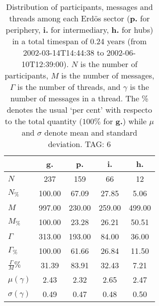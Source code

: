 \begin{table}[h!]
\begin{center}
\begin{tabular}{| l || c | c | c | c |}\hline
 & {\bf g.} & {\bf p.} & {\bf i.} & {\bf h.} \\\hline\hline
$N$ & 237  & 159  & 66  & 12 \\
$N_{\%}$ & 100.00  & 67.09  & 27.85  & 5.06 \\\hline
$M$ & 997.00  & 230.00  & 259.00  & 499.00 \\
$M_{\%}$ & 100.00  & 23.28  & 26.21  & 50.51 \\\hline
$\Gamma$ & 313.00  & 193.00  & 84.00  & 36.00 \\
$\Gamma_{\%}$ & 100.00  & 61.66  & 26.84  & 11.50 \\\hline
$\frac{\Gamma}{M}\%$ & 31.39  & 83.91  & 32.43  & 7.21 \\
$\mu(\gamma)$ & 2.43  & 2.32  & 2.65  & 2.47 \\
$\sigma(\gamma)$ & 0.49  & 0.47  & 0.48  & 0.50 \\\hline
\end{tabular}
\caption{Distribution of participants, messages and threads among each Erd\"os sector ({\bf p.} for periphery, {\bf i.} for intermediary, 
    {\bf h.} for hubs) in a total timespan of 0.24 years (from 2002-03-14T14:44:38 to 2002-06-10T12:39:00). $N$ is the number of participants, $M$ is the number of messages, $\Gamma$ is the number of threads, and $\gamma$ is the number of messages in a thread.
    The \% denotes the usual `per cent' with respecto to the total quantity ($100\%$ for {\bf g.})
    while $\mu$ and $\sigma$ denote mean and standard deviation. TAG: 6}
\end{center}
\end{table}